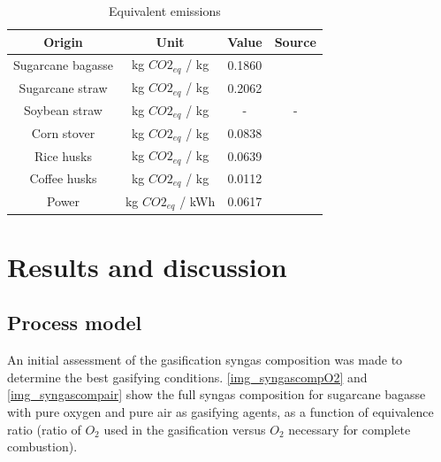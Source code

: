 \documentclass[a4paper, titlepage]{article}
\begin{document}
\begin{table}
    \centering
    \caption{Equivalent emissions}
    \label{tab_emissions}
    \begin{minipage}{\textwidth} \centering
        \begin{tabular}{|c | c | c | c |}
            \hline
            Origin            & Unit                & Value             & Source                                                \\
            \hline
            Sugarcane bagasse & kg $CO2_{eq}$ / kg  & 0.1860            & \cite{jonkerEconomicPerformanceGHG2019}               \\
            Sugarcane straw   & kg $CO2_{eq}$ / kg  & 0.2062            & \cite{figueiredoGreenhouseGasEmissions2023}           \\
            Soybean straw     & kg $CO2_{eq}$ / kg  & -\footnotemark[1] & - \footnotemark[1]                                    \\
            Corn stover       & kg $CO2_{eq}$ / kg  & 0.0838            & \cite{searcyProcessingStrawCorn2008}                  \\
            Rice husks        & kg $CO2_{eq}$ / kg  & 0.0639            & \cite{quispeLifeCycleAssessment2019}                  \\
            Coffee husks      & kg $CO2_{eq}$ / kg  & 0.0112            & \cite{deoliveirafernandesLCAbasedCarbonFootprint2025} \\
            Power             & kg $CO2_{eq}$ / kWh & 0.0617            & \cite{epeBENBalancoEnergetico2023}                    \\
            \hline
        \end{tabular}
    \end{minipage}

\end{table}

\section{Results and discussion}

\subsection{Process model}

An initial assessment of the gasification syngas composition was made to determine the best gasifying conditions.
\autoref{img_syngascompO2} and \autoref{img_syngascompair} show the full syngas composition for sugarcane bagasse with
pure oxygen and pure air as gasifying agents, as a function of equivalence ratio (ratio of $O_2$ used in the
gasification versus $O_2$ necessary for complete combustion).
\end{document}
